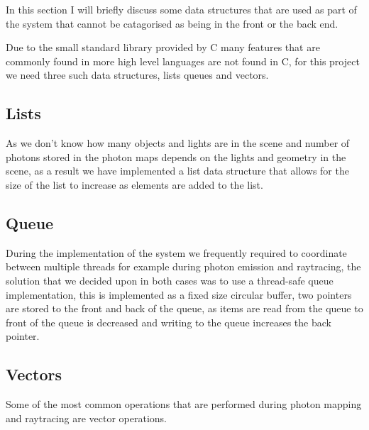 In this section I will briefly discuss some data structures that are used as part of the system that cannot
be catagorised as being in the front or the back end.

Due to the small standard library provided by C many features that are commonly found in more high level languages are not
found in C, for this project we need three such data structures, lists queues and vectors.

\subsection{Lists}
As we don't know how many objects and lights are in the scene and number of photons stored in the photon maps depends on the
lights and geometry in the scene, as a result we have implemented a list data structure that allows for the size of the list
to increase as elements are added to the list.

\subsection{Queue}
During the implementation of the system we frequently required to coordinate between multiple threads for example during
photon emission and raytracing, the solution that we decided upon in both cases was to use a thread-safe queue implementation, this is implemented as a
fixed size circular buffer, two pointers are stored to the front and back of the queue, as items are read from the queue to
front of the queue is decreased and writing to the queue increases the back pointer.

\subsection{Vectors}
Some of the most common operations that are performed during photon mapping and raytracing are vector operations.
